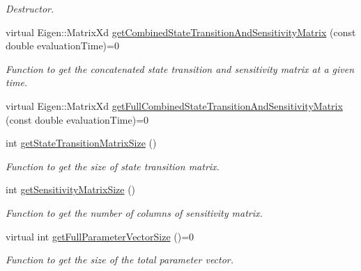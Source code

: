 \begin{DoxyCompactItemize}
\begin{DoxyCompactList}\small\item\em Destructor. \end{DoxyCompactList}\item 
virtual Eigen\+::\+Matrix\+Xd \hyperlink{classtudat_1_1propagators_1_1CombinedStateTransitionAndSensitivityMatrixInterface_ac878b1cd7e3fe120915a55b8da3c5be2}{get\+Combined\+State\+Transition\+And\+Sensitivity\+Matrix} (const double evaluation\+Time)=0
\begin{DoxyCompactList}\small\item\em Function to get the concatenated state transition and sensitivity matrix at a given time. \end{DoxyCompactList}\item 
virtual Eigen\+::\+Matrix\+Xd \hyperlink{classtudat_1_1propagators_1_1CombinedStateTransitionAndSensitivityMatrixInterface_aa97426509a0575040633ca39345f2bf8}{get\+Full\+Combined\+State\+Transition\+And\+Sensitivity\+Matrix} (const double evaluation\+Time)=0
\item 
int \hyperlink{classtudat_1_1propagators_1_1CombinedStateTransitionAndSensitivityMatrixInterface_a3c43147e2f396a4ac17de7aa17ba4be5}{get\+State\+Transition\+Matrix\+Size} ()
\begin{DoxyCompactList}\small\item\em Function to get the size of state transition matrix. \end{DoxyCompactList}\item 
int \hyperlink{classtudat_1_1propagators_1_1CombinedStateTransitionAndSensitivityMatrixInterface_a395cef103204010f38262618ceb39874}{get\+Sensitivity\+Matrix\+Size} ()
\begin{DoxyCompactList}\small\item\em Function to get the number of columns of sensitivity matrix. \end{DoxyCompactList}\item 
virtual int \hyperlink{classtudat_1_1propagators_1_1CombinedStateTransitionAndSensitivityMatrixInterface_af8e2ec2755dfecf36731e372c7828554}{get\+Full\+Parameter\+Vector\+Size} ()=0
\begin{DoxyCompactList}\small\item\em Function to get the size of the total parameter vector. \end{DoxyCompactList}\end{DoxyCompactItemize}
